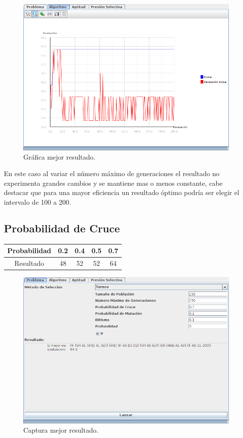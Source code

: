 \documentclass[12pt]{article}
\begin{document}
\begin{figure}[H]
\centering
\includegraphics[scale=0.4]{graficas/nmg56}
\caption{Gráfica mejor resultado.}
\end{figure}

En este caso al variar el número máximo de generaciones el resultado no experimenta grandes cambios y se mantiene mas o menos constante, cabe destacar que para una mayor eficiencia un resultado óptimo podría ser elegir el intervalo de 100 a 200.	

	

\subsection{Probabilidad de Cruce}
\begin{table}[H]
\begin{center}
\begin{tabular}{|ccccc|} \hline
Probabilidad   & 0.2 & 0.4 & 0.5 & 0.7 \\  \hline
Resultado  & 48  & 52 & 52 & 64 \\ \hline
\end{tabular}
\end{center}
\end{table}

\begin{figure}[H]
\centering
\includegraphics[scale=0.4]{graficas/pc64}
\caption{Captura mejor resultado.}
\end{figure}
\end{document}
